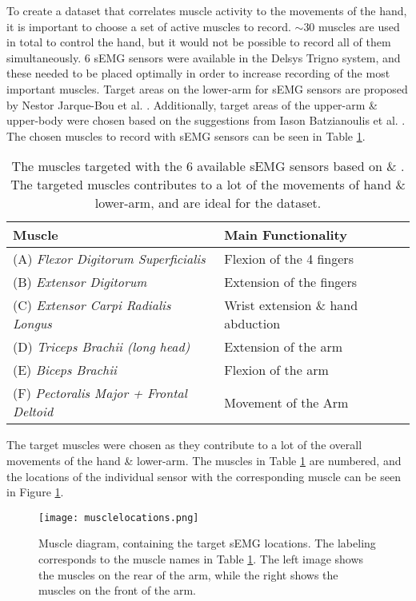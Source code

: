 \documentclass[../main.tex]{subfiles}
\begin{document}
To create a dataset that correlates muscle activity to the movements of the hand, it is important to choose a set of active muscles to record.
$\sim 30$ muscles are used in total to control the hand, but it would not be possible to record all of them simultaneously.
6 sEMG sensors were available in the Delsys Trigno \cite{trigno} system, and these needed to be placed optimally in order to increase recording of the most important muscles.
Target areas on the lower-arm for \gls{sEMG} sensors are proposed by Nestor Jarque-Bou et al. \cite{jarque2019}.
Additionally, target areas of the upper-arm \& upper-body were chosen based on the suggestions from Iason Batzianoulis et al. \cite{Batzianoulis2018}.
The chosen muscles to record with \gls{sEMG} sensors can be seen in Table \ref{tab:muscletargets}.

\begin{table}[H]
\begin{center}
\begin{tabular}{ |l|l| } 
\hline
Muscle & Main Functionality \\ 
\hline
(A) \textit{Flexor Digitorum Superficialis} & Flexion of the 4 fingers \\
(B) \textit{Extensor Digitorum} & Extension of the fingers \\
(C) \textit{Extensor Carpi Radialis Longus} & Wrist extension \& hand abduction \\
(D) \textit{Triceps Brachii (long head)} & Extension of the arm \\
(E) \textit{Biceps Brachii} & Flexion of the arm \\
(F) \textit{Pectoralis Major + Frontal Deltoid} & Movement of the Arm \\
\hline
\end{tabular}
\caption{The muscles targeted with the 6 available \gls{sEMG} sensors based on \cite{Batzianoulis2018} \& \cite{jarque2019}.
 The targeted muscles contributes to a lot of the movements of hand \& lower-arm, and are ideal for the dataset.
}
\label{tab:muscletargets}
\end{center}
\end{table}

The target muscles were chosen as they contribute to a lot of the overall movements of the hand \& lower-arm.
The muscles in Table \ref{tab:muscletargets} are numbered, and the locations of the individual sensor with the corresponding muscle can be seen in Figure \ref{fig:musclesensordiagram}.

\begin{figure}[H]
\begin{center}
\texttt{[image: musclelocations.png]}
\caption{Muscle diagram, containing the target \gls{sEMG} locations. The labeling corresponds to the muscle names in Table \ref{tab:muscletargets}. The left image shows the muscles on the rear of the arm, while the right shows the muscles on the front of the arm.}
\label{fig:musclesensordiagram}
\end{center}
\end{figure}
\end{document}
